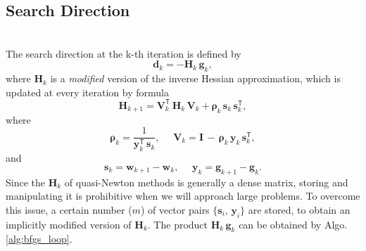 \subsection{Search Direction}\label{search_direction_qn} 
\\
The search direction at the k-th iteration is defined by
\begin{equation}
    \mathbf{d}_k = - \mathbf{H}_k \, \mathbf{g}_k,
\end{equation}
where $\mathbf{H}_k$ is a \emph{modified} version of the inverse Hessian approximation, which is updated at every iteration by formula
\begin{equation}
    \mathbf{H}_{k+1}=\mathbf{V}_k^\mathsf{T} \, \mathbf{H}_k \, \mathbf{V}_k + \boldsymbol\rho_k \, \mathbf{s}_k \, \mathbf{s}_k^\mathsf{T},
    \label{eq:bfgs_H_update}
\end{equation}
where 
\begin{equation}
    \boldsymbol\rho_k = \frac{1}{\mathbf{y}_k^\mathsf{T} \, \mathbf{s}_k}, \,\,\,\,\,\,\,\, \mathbf{V}_k = \mathbf{I} \, - \, \boldsymbol\rho_k \, \mathbf{y}_k \, \mathbf{s}_k^\mathsf{T},
    \label{}
\end{equation}
and
\begin{equation}
    \mathbf{s}_k = \mathbf{w}_{k+1} - \mathbf{w}_k, \,\,\,\,\,\,\,\, \mathbf{y}_k = \mathbf{g}_{k+1} - \mathbf{g}_k.
    \label{}
\end{equation}
Since the $\mathbf{H}_k$ of quasi-Newton methods is generally a dense matrix, storing and manipulating it is prohibitive when we will approach large problems. To overcome this issue, a certain number ($m$) of vector pairs $\{ \mathbf{s}_i, \, \mathbf{y}_i\}$ are stored, to obtain an implicitly modified version of $\mathbf{H}_k$. The product $\mathbf{H}_k \, \mathbf{g}_k$ can be obtained by Algo. \ref{alg:bfgs_loop}.

